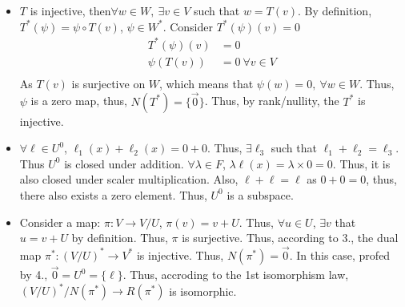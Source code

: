 \documentclass{article}
\begin{document}
\begin{itemize}
\begin{itemize}
\begin{align*}
\begin{pmatrix}
            \end{pmatrix},
            \begin{pmatrix}
                0&0&0\\
                0&0&0\\
                0&0&1
            \end{pmatrix}
            \right\}
        \end{align*}
    \end{itemize}
    \item [3.] \(T\) is injective, then\(\forall w\in W,\ \exists v\in V\) such that \(w=T(v)\). By definition, 
    \(T^*(\psi) =\psi\circ T (v) \), \(\psi\in W^*\). Consider \(T^*(\psi)(v) = 0\)
    \begin{align*}
        T^*(\psi)(v) &= 0\\
        \psi(T(v))&=0 \ \forall v\in V\\
    \end{align*}
    As \(T(v)\) is surjective on \(W\), which means that \(\psi(w)=0,\ \forall w\in W\). Thus, \(\psi\) is a zero map, thus, \(N(T^*) = \{\overrightarrow{0}\}\). Thus, by rank/nullity, the \(T^*\) is injective.
    \item [4.]\(\forall \ell\in U^0\), \(\ell_1(x)+\ell_2(x) = 0+0\). Thus, \(\exists \ell_3\) such that \(\ell_1+\ell_2=\ell_3\). Thus \(U^0\) is closed under addition.
              \(\forall \lambda\in F\), \(\lambda \ell(x)=\lambda\times 0 = 0\). Thus, it is also closed under scaler multiplication. Also, \(\ell+\ell=\ell\) as \(0+0=0\), thus, there also exists a zero element. Thus, \(U^0\) is a subspace.
    \item [5.]Consider a map: \(\pi:V\rightarrow V/U\), \(\pi(v)=v+U\). Thus, \(\forall u\in U\), \(\exists v\) that \(u=v+U\) by definition. Thus, \(\pi\) is surjective. Thus, according to 3., the dual map \(\pi^*:(V/U)^*\rightarrow V^*\) is injective. 
    Thus, \(N(\pi^*)={\overrightarrow{0}}\). In this case, profed by 4., \(\overrightarrow{0}=U^0=\{\ell\}\). Thus, accroding to the 1st isomorphism law,
    \({(V/U)^*}/{N(\pi^*)}\rightarrow R(\pi^*)\) is isomorphic.
\end{itemize}
\end{document}
